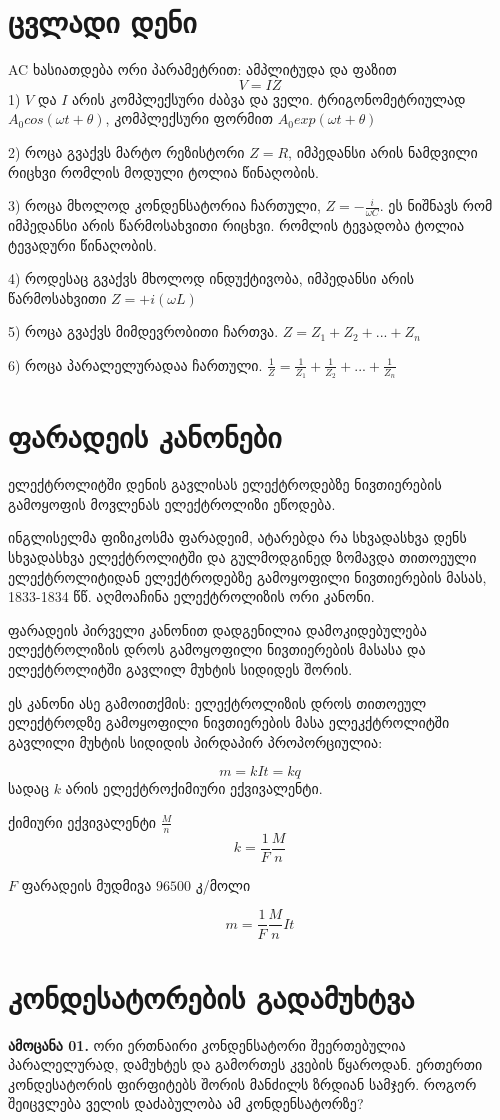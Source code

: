 \documentclass[a4paper]{book}
\begin{document}
\section{ცვლადი დენი}

AC ხასიათდება ორი პარამეტრით: ამპლიტუდა და ფაზით
$$V = IZ$$
1) $V$ და $I$ არის კომპლექსური ძაბვა და ველი. ტრიგონომეტრიულად $A_0cos(\omega t + \theta)$, კომპლექსური ფორმით $A_0exp(\omega t + \theta)$

2) როცა გვაქვს მარტო რეზისტორი $Z=R$, იმპედანსი არის ნამდვილი რიცხვი რომლის მოდული ტოლია წინაღობის.

3) როცა მხოლოდ კონდენსატორია ჩართული, $Z=-\frac{i}{\omega C}$. ეს ნიშნავს რომ იმპედანსი არის წარმოსახვითი რიცხვი. რომლის ტევადობა ტოლია ტევადური წინაღობის.

4) როდესაც გვაქვს მხოლოდ ინდუქტივობა, იმპედანსი არის წარმოსახვითი $Z = + i(\omega L)$ 

5) როცა გვაქვს მიმდევრობითი ჩართვა. $Z = Z_1 + Z_2 + ... + Z_n$

6) როცა პარალელურადაა ჩართული. $\frac{1}{Z} = \frac{1}{Z_1} + \frac{1}{Z_2} + ... + \frac{1}{Z_n}$

\section{ფარადეის კანონები}

ელექტროლიტში დენის გავლისას ელექტროდებზე ნივთიერების გამოყოფის მოვლენას ელექტროლიზი ეწოდება.

ინგლისელმა ფიზიკოსმა ფარადეიმ, ატარებდა რა სხვადასხვა დენს
სხვადასხვა ელექტროლიტში და გულმოდგინედ ზომავდა თითოეული
ელექტროლიტიდან ელექტროდებზე გამოყოფილი ნივთიერების მასას,
1833-1834 წწ. აღმოაჩინა ელექტროლიზის ორი კანონი.

ფარადეის პირველი კანონით დადგენილია დამოკიდებულება ელექტროლიზის დროს გამოყოფილი ნივთიერების მასასა და ელექტროლიტში გავლილ მუხტის სიდიდეს შორის. 

ეს კანონი ასე გამოითქმის: ელექტროლიზის დროს თითოეულ ელექტროდზე გამოყოფილი ნივთიერების მასა ელეკქტროლიტში გავლილი მუხტის სიდიდის პირდაპირ პროპორციულია:

$$m = kIt = kq$$
სადაც $k$ არის ელექტროქიმიური ექვივალენტი.

ქიმიური ექვივალენტი $\frac{M}{n}$
$$k = \frac{1}{F}\frac{M}{n}$$

$F$ ფარადეის მუდმივა $96500$ კ/მოლი

$$m = \frac{1}{F}\frac{M}{n}It$$

\section{კონდესატორების გადამუხტვა}
\textbf{ამოცანა 01.} ორი ერთნაირი კონდენსატორი შეერთებულია პარალელურად, დამუხტეს და გამორთეს კვების წყაროდან. ერთერთი კონდესატორის ფირფიტებს შორის მანძილს ზრდიან სამჯერ. როგორ შეიცვლება ველის დაძაბულობა ამ კონდენსატორზე?
\end{document}
